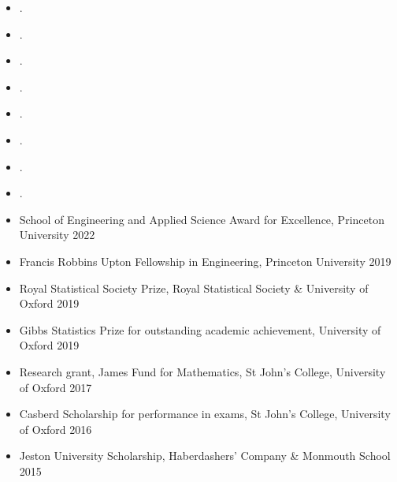 \documentclass[
  date,
  number,
]{wgu-cv}
\begin{document}
\begin{itemize}
  \item {}.
  \item {}.
\end{itemize}

\begin{itemize}
  \item {}.
\end{itemize}

\begin{itemize}
  \item {}.
  \item {}.
  \item {}.
\end{itemize}

\begin{itemize}
  \item {}.
  \item {}.
\end{itemize}


\begin{itemize}
  \item School of Engineering and Applied Science Award for Excellence,
    Princeton University
    \hfill 2022%
  \item Francis Robbins Upton Fellowship in Engineering,
    Princeton University
    \hfill 2019%
  \item Royal Statistical Society Prize,
    Royal Statistical Society \& University of Oxford
    \hfill 2019%
  \item Gibbs Statistics Prize for outstanding academic achievement,
    University of Oxford
    \hfill 2019%
  \item Research grant, James Fund for Mathematics,
    St John's College, University of Oxford
    \hfill 2017%
  \item Casberd Scholarship for performance in exams,
    St John's College, University of Oxford
    \hfill 2016%
  \item Jeston University Scholarship,
    Haberdashers' Company \& Monmouth School
    \hfill 2015%
\end{itemize}
\end{document}
